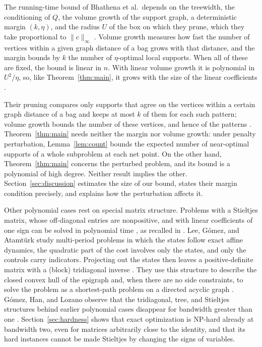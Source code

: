 The running-time bound of Bhathena et al.\ depends on the treewidth, the
conditioning of $Q$, the volume growth of the support graph, a
deterministic margin $(k,\eta)$, and the radius $U$ of the box on which
they prune, which they take proportional to $\|c\|_\infty$
\cite[Lemma~3, Definition~5, Lemma~9, and
Theorem~1]{BhathenaStructured}. Volume growth measures how fast the
number of vertices within a given graph distance of a bag grows with
that distance, and the margin bounds by $k$ the number of
$\eta$-optimal local supports. When all of these are fixed, the bound is
linear in $n$. With linear volume growth it is polynomial in
$U^2/\eta$, so, like Theorem~\ref{thm:main}, it grows with the size of
the linear coefficients \cite[Theorem~1 and
Corollary~1]{BhathenaStructured}.

Their pruning compares only supports that agree on the vertices within
a certain graph distance of a bag and keeps at most $k$ of them for
each such pattern; volume growth bounds the number of these vertices,
and hence of the patterns \cite[Lemmas~8 and~9]{BhathenaStructured}.
Theorem~\ref{thm:main} needs neither the margin nor volume growth: under
penalty perturbation, Lemma~\ref{lem:count} bounds the expected number
of near-optimal supports of a whole subproblem at each net point. On the
other hand, Theorem~\ref{thm:main} concerns the perturbed problem, and
its bound is a polynomial of high degree. Neither result implies the
other. Section~\ref{sec:discussion} estimates the size of our bound,
states their margin condition precisely, and explains how the
perturbation affects it.

Other polynomial cases rest on special matrix structure. Problems with a
Stieltjes matrix, whose off-diagonal entries are nonpositive, and with
linear coefficients of one sign can be solved in polynomial time
\cite{AtamturkGomezM}, as recalled in \cite{LiuStieltjes}. Lee,
G\'omez, and Atamt\"urk study multi-period problems in which the states
follow exact affine dynamics, the quadratic part of the cost involves
only the states, and only the controls carry indicators. Projecting out
the states then leaves a positive-definite matrix with a (block)
tridiagonal inverse \cite[Propositions~1 and~2]{LeeMultiperiod}. They
use this structure to describe the closed convex hull of the epigraph
\cite[Theorems~1 and~2]{LeeMultiperiod} and, when there are no side
constraints, to solve the problem as a shortest-path problem on a
directed acyclic graph \cite[Proposition~9 and
Corollary~3]{LeeMultiperiod}. G\'omez, Han, and Lozano observe that the
tridiagonal, tree, and Stieltjes structures behind earlier polynomial
cases disappear for bandwidth greater than one
\cite[Section~1.1]{GomezBanded}. Section~\ref{sec:hardness} shows that
exact optimization is NP-hard already at bandwidth two, even for
matrices arbitrarily close to the identity, and that its hard instances
cannot be made Stieltjes by changing the signs of variables.

